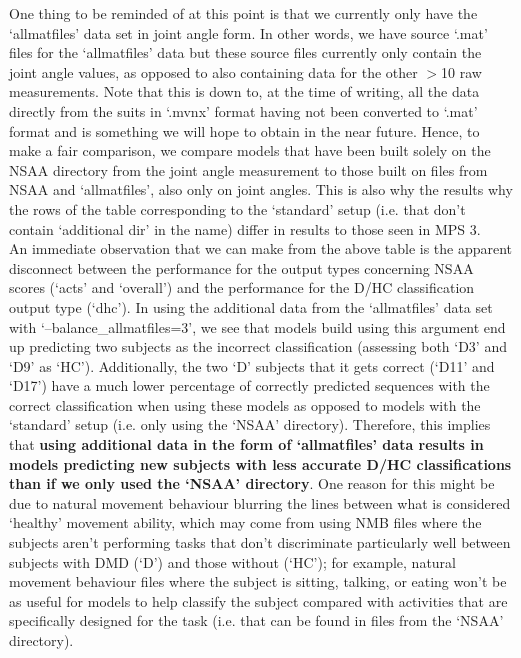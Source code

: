 \documentclass[12pt,twoside]{report}
\begin{document}
\quad One thing to be reminded of at this point is that we currently only have the ‘allmatfiles’ data set in joint angle form. In other words, we have source ‘.mat’ files for the ‘allmatfiles’ data but these source files currently only contain the joint angle values, as opposed to also containing data for the other $>$10 raw measurements. Note that this is down to, at the time of writing, all the data directly from the suits in ‘.mvnx’ format having not been converted to ‘.mat’ format and is something we will hope to obtain in the near future. Hence, to make a fair comparison, we compare models that have been built solely on the NSAA directory from the joint angle measurement to those built on files from NSAA and ‘allmatfiles’, also only on joint angles. This is also why the results why the rows of the table corresponding to the ‘standard’ setup (i.e. that don’t contain ‘additional dir’ in the name) differ in results to those seen in MPS 3.\\

\quad An immediate observation that we can make from the above table is the apparent disconnect between the performance for the output types concerning NSAA scores (‘acts’ and ‘overall’) and the performance for the D/HC classification output type (‘dhc’). In using the additional data from the ‘allmatfiles’ data set with ‘--balance\_allmatfiles=3’, we see that models build using this argument end up predicting two subjects as the incorrect classification (assessing both ‘D3’ and ‘D9’ as ‘HC’). Additionally, the two ‘D’ subjects that it gets correct (‘D11’ and ‘D17’) have a much lower percentage of correctly predicted sequences with the correct classification when using these models as opposed to models with the ‘standard’ setup (i.e. only using the ‘NSAA’ directory). Therefore, this implies that \textbf{using additional data in the form of ‘allmatfiles’ data results in models predicting new subjects with less accurate D/HC classifications than if we only used the ‘NSAA’ directory}. One reason for this might be due to natural movement behaviour blurring the lines between what is considered ‘healthy’ movement ability, which may come from using NMB files where the subjects aren’t performing tasks that don’t discriminate particularly well between subjects with DMD (‘D’) and those without (‘HC’); for example, natural movement behaviour files where the subject is sitting, talking, or eating won’t be as useful for models to help classify the subject compared with activities that are specifically designed for the task (i.e. that can be found in files from the ‘NSAA’ directory).\\
\end{document}

